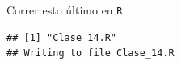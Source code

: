 \documentclass[onesided]{article}\usepackage[]{graphicx}\usepackage[]{color}
\makeatletter
\newenvironment{kframe}{%
 \def\at@end@of@kframe{}%
 \ifinner\ifhmode%
  \def\at@end@of@kframe{\end{minipage}}%
  \begin{minipage}{\columnwidth}%
 \fi\fi%
 \def\FrameCommand##1{\hskip\@totalleftmargin \hskip-\fboxsep
 \colorbox{shadecolor}{##1}\hskip-\fboxsep
     \hskip-\linewidth \hskip-\@totalleftmargin \hskip\columnwidth}%
 \MakeFramed {\advance\hsize-\width
   \@totalleftmargin\z@ \linewidth\hsize
   \@setminipage}}%
 {\par\unskip\endMakeFramed%
 \at@end@of@kframe}
\newenvironment{knitrout}{}{} %
\makeatother
\begin{document}
Correr esto \'ultimo en \texttt{R}.

\begin{knitrout}
\color{fgcolor}\begin{kframe}
\begin{verbatim}
## [1] "Clase_14.R"
## Writing to file Clase_14.R
\end{verbatim}
\end{kframe}
\end{knitrout}
\end{document}

